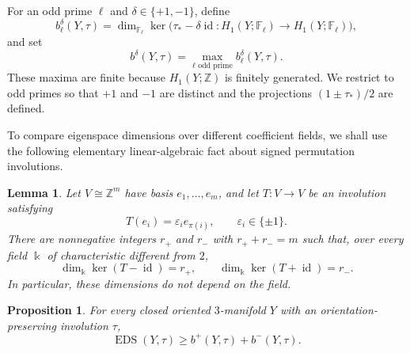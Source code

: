 \documentclass[11pt]{amsart}
\newcommand{\EDS}{\operatorname{EDS}}
\newcommand{\id}{\operatorname{id}}
\newcommand{\F}{\mathbb{F}}
\newcommand{\Z}{\mathbb{Z}}
\newtheorem{proposition}[theorem]{Proposition}
\newtheorem{lemma}[theorem]{Lemma}
\theoremstyle{definition}
\theoremstyle{remark}
\begin{document}
For an odd prime $\ell$ and $\delta\in\{+1,-1\}$, define
\[
   b^\delta_\ell(Y,\tau)
   =\dim_{\F_\ell}
   \ker\bigl(\tau_*-\delta\id:H_1(Y;\F_\ell)\to H_1(Y;\F_\ell)\bigr),
\]
and set
\[
   b^\delta(Y,\tau)=\max_{\ell\text{ odd prime}}b^\delta_\ell(Y,\tau).
\]
These maxima are finite because $H_1(Y;\Z)$ is finitely generated. We restrict to odd primes so that $+1$ and $-1$ are distinct and the projections $(1\pm\tau_*)/2$ are defined.

To compare eigenspace dimensions over different coefficient fields, we shall use the following elementary linear-algebraic fact about signed permutation involutions.

\begin{lemma}\label{lem:signed-permutation}
Let $V\cong\Z^m$ have basis $e_1,\dots,e_m$, and let $T\colon V\to V$ be an involution satisfying
\[
   T(e_i)=\varepsilon_i e_{\pi(i)},
   \qquad
   \varepsilon_i\in\{\pm1\}.
\]
There are nonnegative integers $r_+$ and $r_-$ with $r_++r_-=m$ such that, over every field $\Bbbk$ of characteristic different from $2$,
\[
   \dim_{\Bbbk}\ker(T-\id)=r_+,
   \qquad
   \dim_{\Bbbk}\ker(T+\id)=r_-.
\]
In particular, these dimensions do not depend on the field.
\end{lemma}


\begin{proposition}\label{prop:homological-bound}
For every closed oriented $3$-manifold $Y$ with an orientation-preserving involution $\tau$,
\[
   \EDS(Y,\tau)\geq b^+(Y,\tau)+b^-(Y,\tau).
\]
\end{proposition}
\end{document}
